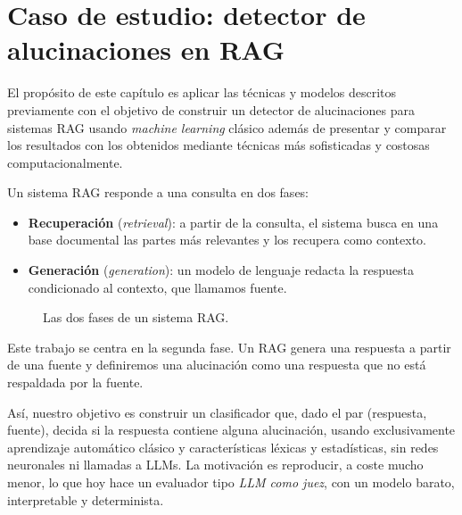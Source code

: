 \documentclass[12pt,a4paper]{report}
\theoremstyle{definition}
\begin{document}
\chapter{Caso de estudio: detector de alucinaciones en RAG}

El propósito de este capítulo es aplicar las técnicas y modelos descritos previamente con el objetivo de construir un detector de alucinaciones para sistemas RAG usando \emph{machine learning} clásico además de presentar y comparar los resultados con los obtenidos mediante técnicas más sofisticadas y costosas computacionalmente. 

Un sistema RAG responde a una consulta en dos fases:
\begin{itemize}
  \item \textbf{Recuperación} (\emph{retrieval}): a partir de la consulta, el
        sistema busca en una base documental las partes más relevantes y los
        recupera como contexto.
  \item \textbf{Generación} (\emph{generation}): un modelo de lenguaje redacta la
        respuesta condicionado al contexto, que llamamos fuente.
\end{itemize}

\begin{figure}[H]
\centering
{}
\caption{Las dos fases de un sistema RAG.}
\label{fig:rag}
\end{figure}

Este trabajo se centra en la segunda fase. Un RAG genera una respuesta a partir de una fuente y definiremos una alucinación como una respuesta que no está respaldada por la fuente.

Así, nuestro objetivo es construir un clasificador que, dado el par (respuesta, fuente), decida si la respuesta contiene alguna alucinación, usando exclusivamente aprendizaje automático clásico y características léxicas y estadísticas, sin redes neuronales ni llamadas a LLMs. La motivación es reproducir, a coste mucho menor, lo que hoy hace un evaluador tipo \emph{LLM como juez}, con un modelo barato, interpretable y determinista.
\end{document}
